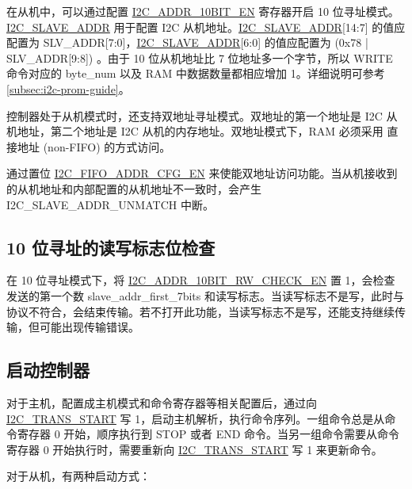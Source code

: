 \documentclass[main\_\_CN.tex]{subfiles}
\begin{document}
在从机中，可以通过配置 \hyperref[fielddesc:I2CADDR10BITEN]{I2C\_ADDR\_10BIT\_EN} 寄存器开启 10 位寻址模式。 \hyperref[fielddesc:I2CSLAVEADDR]{I2C\_SLAVE\_ADDR} 用于配置 I2C 从机地址。\hyperref[fielddesc:I2CSLAVEADDR]{I2C\_SLAVE\_ADDR}[14:7] 的值应配置为 SLV\_ADDR[7:0]，\hyperref[fielddesc:I2CSLAVEADDR]{I2C\_SLAVE\_ADDR}[6:0] 的值应配置为 (0x78 | SLV\_ADDR[9:8]) 。由于 10 位从机地址比 7 位地址多一个字节，所以 WRITE 命令对应的 byte\_num 以及 RAM 中数据数量都相应增加 1。详细说明可参考 \ref{subsec:i2c-prom-guide}。

控制器处于从机模式时，还支持双地址寻址模式。双地址的第一个地址是 I2C 从机地址，第二个地址是 I2C 从机的内存地址。双地址模式下，RAM 必须采用 直接地址 (non-FIFO) 的方式访问。

通过置位 \hyperref[fielddesc:I2CFIFOADDRCFGEN]{I2C\_FIFO\_ADDR\_CFG\_EN} 来使能双地址访问功能。当从机接收到的从机地址和内部配置的从机地址不一致时，会产生 I2C\_SLAVE\_ADDR\_UNMATCH 中断。

\subsection{10 位寻址的读写标志位检查}

在 10 位寻址模式下，将 \hyperref[fielddesc:I2CADDR10BITRWCHECKEN]{I2C\_ADDR\_10BIT\_RW\_CHECK\_EN} 置 1，会检查发送的第一个数 slave\_addr\_first\_7bits 和读写标志。当读写标志不是写，此时与协议不符合，会结束传输。若不打开此功能，当读写标志不是写，还能支持继续传输，但可能出现传输错误。

\subsection{启动控制器}
\label{subsubsec:i2c-start}

对于主机，配置成主机模式和命令寄存器等相关配置后，通过向 \hyperref[fielddesc:I2CTRANSSTART]{I2C\_TRANS\_START} 写 1，启动主机解析，执行命令序列。一组命令总是从命令寄存器 0 开始，顺序执行到 STOP 或者 END 命令。当另一组命令需要从命令寄存器 0 开始执行时，需要重新向 \hyperref[fielddesc:I2CTRANSSTART]{I2C\_TRANS\_START} 写 1 来更新命令。

对于从机，有两种启动方式：
\end{document}
